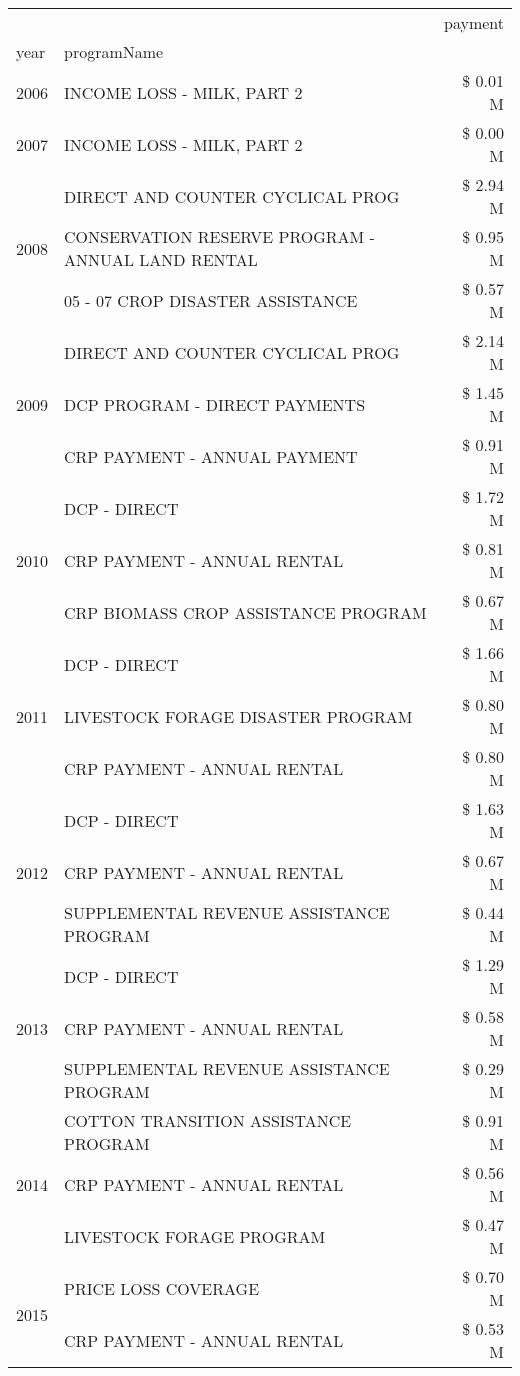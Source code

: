 \begin{tabular}{llr}
\toprule
 &  & payment \\
year & programName &  \\
\midrule
2006 & INCOME LOSS - MILK, PART 2 & \$ 0.01 M \\
\cline{1-3}
2007 & INCOME LOSS - MILK, PART 2 & \$ 0.00 M \\
\cline{1-3}
\multirow[t]{3}{*}{2008} & DIRECT AND COUNTER CYCLICAL PROG & \$ 2.94 M \\
 & CONSERVATION RESERVE PROGRAM - ANNUAL LAND RENTAL & \$ 0.95 M \\
 & 05 - 07 CROP DISASTER ASSISTANCE & \$ 0.57 M \\
\cline{1-3}
\multirow[t]{3}{*}{2009} & DIRECT AND COUNTER CYCLICAL PROG & \$ 2.14 M \\
 & DCP PROGRAM - DIRECT PAYMENTS & \$ 1.45 M \\
 & CRP PAYMENT - ANNUAL PAYMENT & \$ 0.91 M \\
\cline{1-3}
\multirow[t]{3}{*}{2010} & DCP - DIRECT & \$ 1.72 M \\
 & CRP PAYMENT - ANNUAL RENTAL & \$ 0.81 M \\
 & CRP BIOMASS CROP ASSISTANCE PROGRAM & \$ 0.67 M \\
\cline{1-3}
\multirow[t]{3}{*}{2011} & DCP - DIRECT & \$ 1.66 M \\
 & LIVESTOCK FORAGE DISASTER PROGRAM & \$ 0.80 M \\
 & CRP PAYMENT - ANNUAL RENTAL & \$ 0.80 M \\
\cline{1-3}
\multirow[t]{3}{*}{2012} & DCP - DIRECT & \$ 1.63 M \\
 & CRP PAYMENT - ANNUAL RENTAL & \$ 0.67 M \\
 & SUPPLEMENTAL REVENUE ASSISTANCE PROGRAM & \$ 0.44 M \\
\cline{1-3}
\multirow[t]{3}{*}{2013} & DCP - DIRECT & \$ 1.29 M \\
 & CRP PAYMENT - ANNUAL RENTAL & \$ 0.58 M \\
 & SUPPLEMENTAL REVENUE ASSISTANCE PROGRAM & \$ 0.29 M \\
\cline{1-3}
\multirow[t]{3}{*}{2014} & COTTON TRANSITION ASSISTANCE PROGRAM & \$ 0.91 M \\
 & CRP PAYMENT - ANNUAL RENTAL & \$ 0.56 M \\
 & LIVESTOCK FORAGE PROGRAM & \$ 0.47 M \\
\cline{1-3}
\multirow[t]{3}{*}{2015} & PRICE LOSS COVERAGE & \$ 0.70 M \\
 & CRP PAYMENT - ANNUAL RENTAL & \$ 0.53 M \\

\end{tabular}
